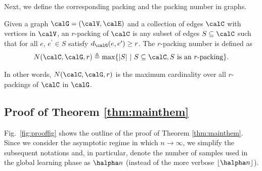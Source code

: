 \documentclass[11pt,onecolumn]{article}
\begin{document}
Next, we define the corresponding packing and the packing number in graphs.
\begin{definition}
	Given a graph $\calG=(\calV,\calE)$ and a collection of edges $\calC$ with vertices in $\calV$, an $r$-packing of $\calC$ is any subset of edges $S\subseteq\calC$ such that 
	for all $e$, $e^{\prime}\in S$ satisfy $d_{\calG}(e,e^{\prime})\geq r$. The $r$-packing number is defined as
	\begin{align}
		N(\calC,\calG,r)\triangleq\max \{|S| \ | \ S\subseteq\calC , S \text{ is an }r\text{-packing}\}.
	\end{align}
\end{definition}
In other words,  $N(\calC,\calG,r)$ is the maximum cardinality over all  $r$-packings of $\calC$ in $\calG$.
\subsection{Proof of Theorem \ref{thm:mainthem}}
Fig.~\ref{fig:prooffig} shows the outline of the proof of Theorem \ref{thm:mainthem}. Since we consider the asymptotic regime in which  $n\rightarrow\infty$, we  simplify the  subsequent notations and, in particular, denote  the number of samples used in the global learning phase as  $\halpha n$ (instead of the more verbose $\lfloor\halpha n\rfloor$). %
\end{document}
